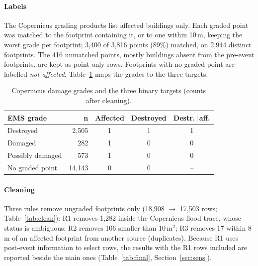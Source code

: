 \documentclass[journal,a4paper]{IEEEtran}
\begin{document}
\paragraph{Labels} The Copernicus grading products list affected buildings only. Each graded point was matched to the footprint containing it, or to one within 10\,m, keeping the worst grade per footprint; 3,400 of 3,816 points (89\%) matched, on 2,944 distinct footprints. The 416 unmatched points, mostly buildings absent from the pre-event footprints, are kept as point-only rows. Footprints with no graded point are labelled \emph{not affected}. Table~\ref{tab:grades} maps the grades to the three targets.

\begin{table}[t]
\centering\footnotesize
\setlength{\tabcolsep}{3pt}
\caption{Copernicus damage grades and the three binary targets (counts after cleaning).}\label{tab:grades}
\begin{tabular}{@{}lrccc@{}}
\toprule
\textbf{EMS grade} & \textbf{n} & \textbf{Affected} & \textbf{Destroyed} & \textbf{Destr.\,$\mid$\,aff.}\\
\midrule
Destroyed & 2,505 & 1 & 1 & 1\\
Damaged & 282 & 1 & 0 & 0\\
Possibly damaged & 573 & 1 & 0 & 0\\
No graded point & 14,143 & 0 & 0 & --\\
\bottomrule
\end{tabular}
\end{table}

\paragraph{Cleaning} Three rules remove ungraded footprints only (18,908 $\rightarrow$ 17,503 rows; Table~\ref{tab:clean}): R1 removes 1,282 inside the Copernicus flood trace, whose status is ambiguous; R2 removes 106 smaller than 10\,m$^2$; R3 removes 17 within 8\,m of an affected footprint from another source (duplicates). Because R1 uses post-event information to select rows, the results with the R1 rows included are reported beside the main ones (Table~\ref{tab:final}, Section~\ref{sec:sens}).
\end{document}
